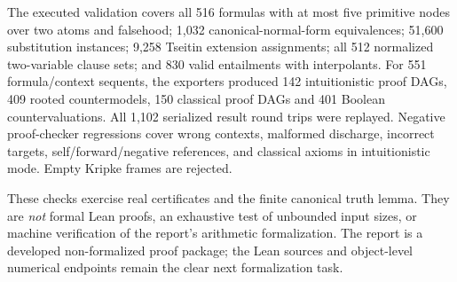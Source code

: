 The executed validation covers all 516 formulas with at most five
primitive nodes over two atoms and falsehood; 1,032 canonical-normal-form
equivalences; 51,600 substitution instances; 9,258 Tseitin extension
assignments; all 512 normalized two-variable clause sets; and 830 valid
entailments with interpolants. For 551 formula/context sequents, the
exporters produced 142 intuitionistic proof DAGs, 409 rooted countermodels,
150 classical proof DAGs and 401 Boolean countervaluations. All 1,102
serialized result round trips were replayed. Negative proof-checker
regressions cover wrong contexts, malformed discharge, incorrect targets,
self/forward/negative references, and classical axioms in intuitionistic
mode. Empty Kripke frames are rejected.

These checks exercise real certificates and the finite canonical truth
lemma. They are \emph{not} formal Lean proofs, an exhaustive test of
unbounded input sizes, or machine verification of the report's arithmetic
formalization. The report is a developed non-formalized proof package;
the Lean sources and object-level numerical endpoints remain the clear
next formalization task.
